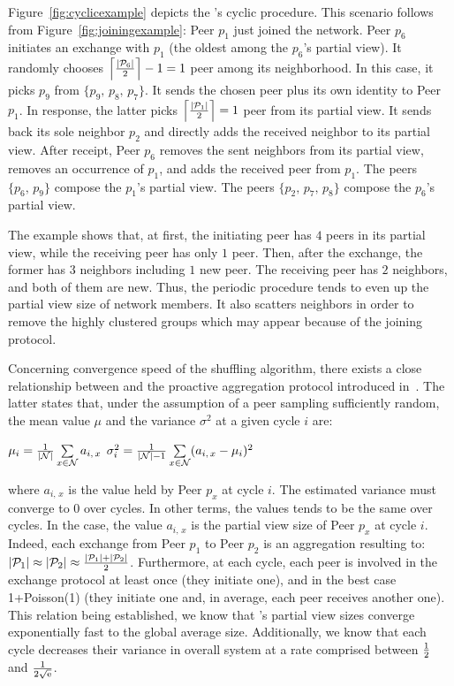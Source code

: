 Figure~\ref{fig:cyclicexample} depicts the \SPRAY{}'s cyclic
procedure. This scenario follows from Figure~\ref{fig:joiningexample}:
Peer $p_1$ just joined the network. Peer $p_6$ initiates an exchange
with $p_1$ (the oldest among the $p_6$'s partial view). It randomly
chooses $\left\lceil{|\mathcal{P}_6|\over{2}}\right\rceil-1 = 1$ peer
among its neighborhood. In this case, it picks $p_9$ from
$\{p_9,\,p_8,\,p_7\}$.  It sends the chosen peer plus its own identity
to Peer $p_1$. In response, the latter picks
$\left\lceil{|\mathcal{P}_1|\over{2}}\right\rceil = 1$ peer from its
partial view. It sends back its sole neighbor $p_2$ and directly adds
the received neighbor to its partial view. After receipt, Peer $p_6$
removes the sent neighbors from its partial view, removes an
occurrence of $p_1$, and adds the received peer from $p_1$. The peers
$\{p_6,\,p_9\}$ compose the $p_1$'s partial view. The peers
$\{p_2,\,p_7,\,p_8\}$ compose the $p_6$'s partial view.

The example shows that, at first, the initiating peer has $4$ peers in
its partial view, while the receiving peer has only $1$ peer. Then,
after the exchange, the former has $3$ neighbors including $1$ new
peer. The receiving peer has $2$ neighbors, and both of them are
new. Thus, the periodic procedure tends to even up the partial view
size of network members. It also scatters neighbors in order to remove
the highly clustered groups which may appear because of the joining
protocol.

Concerning convergence speed of the shuffling algorithm, there exists
a close relationship between \SPRAY{} and the proactive aggregation
protocol introduced
in~\cite{jelasity2004epidemic,montresor2004robust}. The latter states
that, under the assumption of a peer sampling sufficiently random, the
mean value $\mu$ and the variance $\sigma^2$ at a given cycle $i$ are:
\begin{center}
  $\mu_i = {1\over{|\mathcal{N}|}} \sum\limits_{x \in \mathcal{N}} a_{i,\,x}$
  \hfill
  $\sigma^2_i = {1\over{|\mathcal{N}|-1}}\sum\limits_{x \in \mathcal{N}}
  (a_{i,\,x} - \mu_i)^2$
\end{center}
where $a_{i,\,x}$ is the value held by Peer $p_x$ at cycle $i$. The estimated
variance must converge to $0$ over cycles. In other terms, the values tends to
be the same over cycles. In the \SPRAY{} case, the value $a_{i,\,x}$ is the
partial view size of Peer $p_x$ at cycle $i$. Indeed, each exchange from Peer
$p_1$ to Peer $p_2$ is an aggregation resulting to:
$|\mathcal{P}_1|\approx|\mathcal{P}_2|\approx{|\mathcal{P}_1| + |\mathcal{P}_2|
  \over{2}}$.
Furthermore, at each cycle, each peer is involved in the exchange protocol at
least once (they initiate one), and in the best case 1+Poisson(1) (they
initiate one and, in average, each peer receives another one). This relation
being established, we know that \SPRAY{}'s partial view sizes converge
exponentially fast to the global average size. Additionally, we know that each
cycle decreases their variance in overall system at a rate comprised between
${1\over{2}}$ and $1\over{2\sqrt{\text{e}}}$. 

